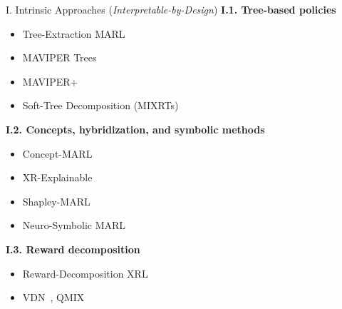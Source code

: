 \begin{frame}{I. Intrinsic Approaches (\textit{Interpretable-by-Design})}
    \small
    \textbf{I.1. Tree-based policies}
    \begin{itemize}
        \item Tree-Extraction MARL~\cite{zhang2024advancing}
        \item MAVIPER Trees~\cite{milani2022maviper}
        \item MAVIPER+~\cite{milani2024interpretable}
        \item Soft-Tree Decomposition (MIXRTs)~\cite{liu2025}
    \end{itemize}

    \vspace{2mm}
    \textbf{I.2. Concepts, hybridization, and symbolic methods}
    \begin{itemize}
        \item Concept-MARL~\cite{zabounidis2023concept}
        \item XR-Explainable~\cite{iturria2024explainable}
        \item Shapley-MARL~\cite{li2025from}
        \item Neuro-Symbolic MARL~\cite{subramanian2024neurosymbolic}
    \end{itemize}

    \vspace{2mm}
    \textbf{I.3. Reward decomposition}
    \begin{itemize}
        \item Reward-Decomposition XRL~\cite{juozapaitis2019explainable}
        \item VDN~\cite{Sunehag2018}, QMIX~\cite{Tabish2018}
    \end{itemize}
\end{frame}


